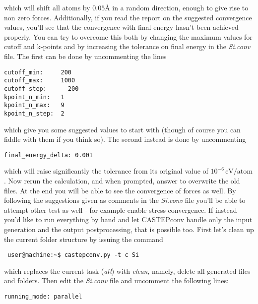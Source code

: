 \documentclass[10pt]{article}
\begin{document}
which will shift all atoms by $0.05 $\AA{} in a random direction, enough to give rise to non zero forces. Additionally, if you read the report on the suggested convergence values, you'll see that the convergence with final energy hasn't been achieved properly. You can try to overcome this both by changing the maximum values for cutoff and k-points and by increasing the tolerance on final energy in the \textit{Si.conv} file. The first can be done by uncommenting the lines

\begin{lstlisting}
cutoff_min:     200
cutoff_max:     1000
cutoff_step:	  200
kpoint_n_min:   1
kpoint_n_max:   9
kpoint_n_step:  2
\end{lstlisting}

which give you some suggested values to start with (though of course you can fiddle with them if you think so). The second instead is done by uncommenting

\begin{lstlisting}
final_energy_delta:	0.001
\end{lstlisting}

which will raise significantly the tolerance from its original value of $10^{-6}\,\mathrm{eV/atom}$.\newline
Now rerun the calculation, and when prompted, answer to overwrite the old files. At the end you will be able to see the convergence of forces as well. By following the suggestions given as comments in the \textit{Si.conv} file you'll be able to attempt other test as well - for example enable stress convergence.\newline
If instead you'd like to run everything by hand and let CASTEPconv handle only the input generation and the output postprocessing, that is possible too. First let's clean up the current folder structure by issuing the command

\begin{lstlisting}
 user@machine:~$ castepconv.py -t c Si
\end{lstlisting}

which replaces the current task (\textit{all}) with \textit{clean}, namely, delete all generated files and folders. Then edit the \textit{Si.conv} file and uncomment the following lines:

\begin{lstlisting}
running_mode: parallel
\end{lstlisting}
\end{document}
